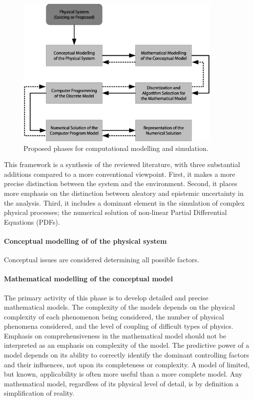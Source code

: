 \begin{figure}[htpb]
  \centering
    \includegraphics[width=0.90\textwidth]{./img/modelling_phases}
\caption[Proposed phases for computational modelling and simulation.]{Proposed
phases for computational modelling and simulation.
\citep[From][]{oberkampf2002-333}}
  \label{fig:modelling_phases}
\end{figure}

This framework is a synthesis of the reviewed literature, with three substantial
additions compared to a more conventional viewpoint. First, it makes a more
precise distinction between the system and the environment. Second, it places
more emphasis on the distinction between aleatory and epistemic uncertainty in
the analysis. Third, it includes a dominant element in the simulation of complex
physical processes; the numerical solution of non-linear Partial Differential
Equations (PDFs).

\paragraph{Conceptual modelling of of the physical system}
Conceptual issues are considered determining all possible factors.

\paragraph{Mathematical modelling of the conceptual model}
The primary activity of this phase is to develop detailed and precise
mathematical models. The complexity of the models depends on the physical
complexity of each phenomenon being considered, the number of physical phenomena
considered, and the level of coupling of difficult types of physics. Emphasis on
comprehensiveness in the mathematical model should not be interpreted as an
emphasis on complexity of the model. The predictive power of a model depends on
its ability to correctly identify the dominant controlling factors and their
influences, not upon its completeness or complexity. A model of limited, but
known, applicability is often more useful than a more complete model. Any
mathematical model, regardless of its physical level of detail, is by definition
a simplification of reality.

